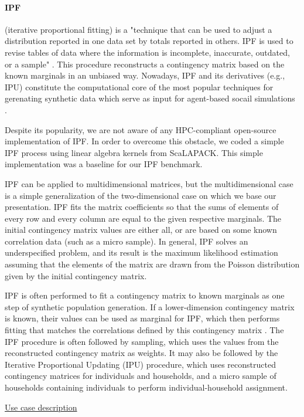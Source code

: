 \paragraph{IPF} (iterative proportional fitting) is a "technique that can be used to adjust a distribution reported in one data set by totals reported in others. IPF is used to revise tables of data where the information is incomplete, inaccurate, outdated, or a sample" \cite{1912:ipf}.
This procedure reconstructs a contingency matrix based on the known marginals in an unbiased way.
Nowadays, IPF and its derivatives (e.g., IPU) constitute the computational core of the most popular techniques for gerenating synthetic data which serve as input for agent-based socail simulations \cite{2017:synpop}.

Despite its popularity, we are not aware of any HPC-compliant open-source implementation of IPF.
In order to overcome this obstacle,
we coded a simple IPF process using linear algebra kernels from \textsf{ScaLAPACK}.
This simple implementation was a baseline for our IPF benchmark.

\iffalse
IPF can be applied to multidimensional matrices, but the multidimensional case is a simple generalization of the two-dimensional case on which we base our presentation.
IPF fits the matrix coefficients so that the sums of elements of every row and every column are equal to the given respective marginals. The initial contingency matrix values are either all, or are based on some known correlation data (such as a micro sample). In general, IPF solves an underspecified problem, and its result is the maximum likelihood estimation assuming that the elements of the matrix are drawn from the Poisson distribution given by the initial contingency matrix.

IPF is often performed to fit a contingency matrix to known marginals as one step of synthetic population generation. If a lower-dimension contingency matrix is known, their values can be used as marginal for IPF, which then performs fitting that matches the correlations defined by this contingency matrix \cite{2018:norman}.
The IPF procedure is often followed by sampling, which uses the values from the reconstructed contingency matrix as weights. It may also be followed by the Iterative Proportional Updating (IPU) procedure, which uses reconstructed contingency matrices for individuals and households, and a micro sample of households containing individuals to perform individual-household assignment.

\underline{Use case description}

